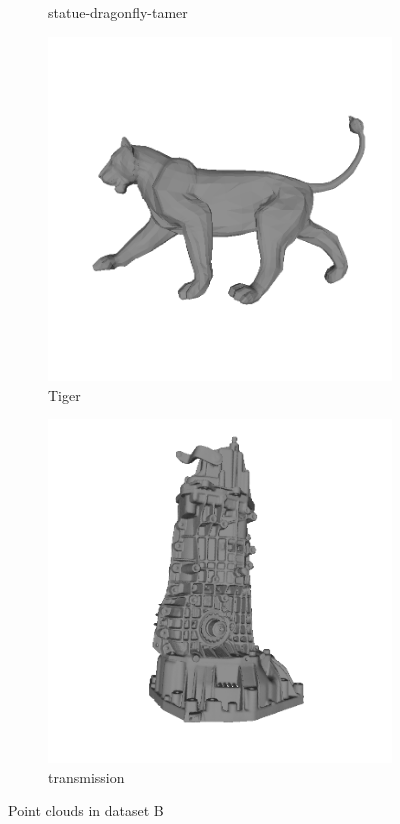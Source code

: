 \begin{figure}
\begin{subfigure}[b]{0.23\linewidth}
	\caption{statue-dragonfly-tamer}
\end{subfigure}
\begin{subfigure}[b]{0.23\linewidth}
	\includegraphics[width=\linewidth]{./Figures/train-dataset/38.tiger.png}
	\caption{Tiger}
\end{subfigure}
\begin{subfigure}[b]{0.23\linewidth}
	\includegraphics[width=\linewidth]{./Figures/train-dataset/39.transmission.png}
	\caption{transmission}
\end{subfigure}
	
	
	\label{fig:dataset_b}
	\caption{Point clouds in dataset B }
\end{figure}



